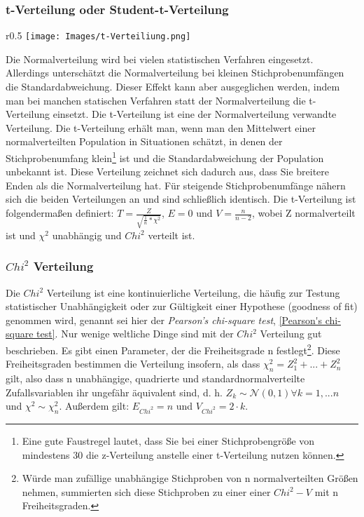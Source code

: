 \documentclass{scrreprt}
\begin{document}
\subsubsection{t-Verteilung oder Student-t-Verteilung}\label{t-Verteilung oder Student-t-Verteilung}
\begin{wrapfigure}{r}{0.5\textwidth}
    \centering
    \texttt{[image: Images/t-Verteiliung.png]}
    \caption{}
    \label{Figur 10}
\end{wrapfigure}
Die Normalverteilung wird bei vielen statistischen Verfahren eingesetzt. Allerdings unterschätzt die Normalverteilung bei kleinen Stichprobenumfängen die Standardabweichung. Dieser Effekt kann aber ausgeglichen werden, indem man bei manchen statischen Verfahren statt der Normalverteilung die t-Verteilung einsetzt. Die t-Verteilung ist eine der Normalverteilung verwandte Verteilung. Die t-Verteilung erhält man, wenn man den Mittelwert einer normalverteilten Population in Situationen schätzt, in denen der Stichprobenumfang klein\footnote{Eine gute Faustregel lautet, dass Sie bei einer Stichprobengröße von mindestens 30 die z-Verteilung anstelle einer t-Verteilung nutzen können.} ist und die Standardabweichung der Population unbekannt ist. Diese Verteilung zeichnet sich dadurch aus, dass Sie breitere Enden als die Normalverteilung hat. Für steigende Stichprobenumfänge nähern sich die beiden Verteilungen an und sind schließlich identisch.
Die t-Verteilung ist folgendermaßen definiert: $T=\frac{Z}{\sqrt{\frac{1}{n}*\chi^2}}$, $E=0$ und $V=\frac{n}{n-2}$, wobei Z normalverteilt ist und $\chi^2$ unabhängig und \textit{$Chi^2$} verteilt ist.
\subsubsection{\textbf{$Chi^2$} Verteilung}\label{Chi Quadrat Verteilung}
Die $Chi^2$ Verteilung ist eine kontinuierliche Verteilung, die häufig zur Testung statistischer Unabhängigkeit oder zur Gültigkeit einer Hypothese (goodness of fit) genommen wird, genannt sei hier der \textit{Pearson's chi-square test}, \ref{Pearson's chi-square test}. Nur wenige weltliche Dinge sind mit der $Chi^2$ Verteilung gut beschrieben. Es gibt einen Parameter, der die Freiheitsgrade n festlegt\footnote{Würde man zufällige unabhängige Stichproben von n normalverteilten Größen nehmen, summierten sich diese Stichproben zu einer einer $Chi^2-V$ mit n Freiheitsgraden.}. Diese Freiheitsgraden bestimmen die Verteilung insofern, als dass $\chi_n^2=Z_1^2+...+Z_n^2$ gilt, also dass n unabhängige, quadrierte und standardnormalverteilte Zufallsvariablen ihr ungefähr äquivalent sind, d. h. $Z_k\sim \mathcal{N} (0,1) \forall k=1,...n$ und $\chi^2\sim\chi_n^2$. Außerdem gilt: $E_{Chi^2}=n$ und $V_{Chi^2}=2\cdot k$. 
\end{document}
